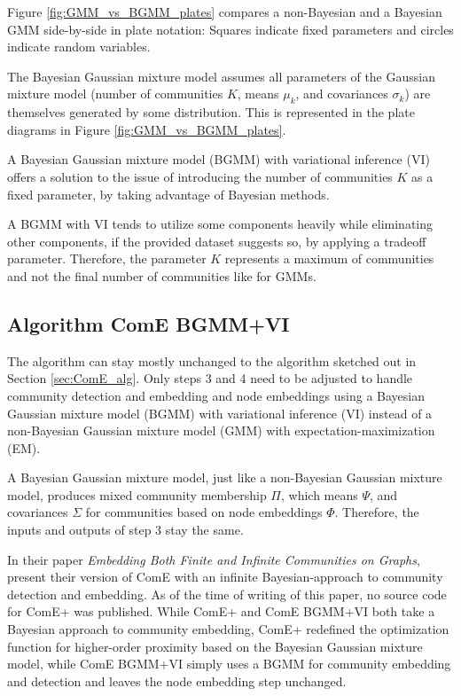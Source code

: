 \documentclass[conference]{IEEEtran}
\begin{document}
Figure \ref{fig:GMM_vs_BGMM_plates} compares a non-Bayesian and a Bayesian GMM side-by-side in plate notation: Squares indicate fixed parameters and circles indicate random variables.

The Bayesian Gaussian mixture model assumes all parameters of the Gaussian mixture model (number of communities $K$, means $\mu_k$, and covariances $\sigma_k$) are themselves generated by some distribution. This is represented in the plate diagrams in Figure \ref{fig:GMM_vs_BGMM_plates}.

A Bayesian Gaussian mixture model (BGMM) with variational inference (VI) offers a solution to the issue of introducing the number of communities $K$ as a fixed parameter, by taking advantage of Bayesian methods.

A BGMM with VI tends to utilize some components heavily while eliminating other components, if the provided dataset suggests so, by applying a tradeoff parameter. Therefore, the parameter $K$ represents a maximum of communities and not the final number of communities like for GMMs.

\subsection{Algorithm ComE BGMM+VI}
\label{sec:ComE_BGMM_alg}

The algorithm can stay mostly unchanged to the algorithm sketched out in Section \ref{sec:ComE_alg}. Only steps 3 and 4 need to be adjusted to handle community detection and embedding and node embeddings using a Bayesian Gaussian mixture model (BGMM) with variational inference (VI) instead of a non-Bayesian Gaussian mixture model (GMM) with expectation-maximization (EM).

A Bayesian Gaussian mixture model, just like a non-Bayesian Gaussian mixture model, produces mixed community membership $\Pi$, which means $\Psi$, and covariances $\Sigma$ for communities based on node embeddings $\Phi$. Therefore, the inputs and outputs of step 3 stay the same.

In their \citeyear{ComE+} paper \textit{Embedding Both Finite and Infinite Communities on Graphs}, \citeauthor{ComE+} present their version of ComE with an infinite Bayesian-approach to community detection and embedding. As of the time of writing of this paper, no source code for ComE+ was published. While ComE+ and ComE BGMM+VI both take a Bayesian approach to community embedding, ComE+ redefined the optimization function for higher-order proximity based on the Bayesian Gaussian mixture model, while ComE BGMM+VI simply uses a BGMM for community embedding and detection and leaves the node embedding step unchanged.
\end{document}
